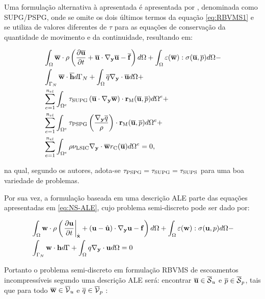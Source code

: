 \documentclass[_ArquivoPrincipal.tex]{subfiles}
\begin{document}
Uma formulação alternativa à apresentada é apresentada por , denominada como SUPG/PSPG, onde se omite os dois últimos termos da equação \ref{eq:RBVMS1} e se utiliza de valores diferentes de $\tau$ para as equações de conservação da quantidade de movimento e da continuidade, resultando em:

\begin{equation}
\begin{split}
    &\int_\Omega{\overline{\mathbf{w}}\cdot\rho\left({\frac{\partial{\overline{\mathbf{u}}}}{\partial{t}}+\overline{\mathbf{u}}\cdot\mathbf{\nabla_y}\overline{\mathbf{u}}-\overline{\mathbf{f}}}\right)d\Omega}+\int_\Omega{\mathbf{\varepsilon}(\overline{\mathbf{w}}):\mathbf{\sigma}(\overline{\mathbf{u}},\overline{p})d\Omega}-\\
    &\int_{\Gamma_N}{\overline{\mathbf{w}}\cdot\overline{\mathbf{h}}d\Gamma_N}+\int_\Omega{\overline{q}\mathbf{\nabla_y}\cdot\overline{\mathbf{u}}d\Omega}+\\
    &\sum_{e=1}^{n_{el}}{\int_{\Omega^e}{\tau_{\mathrm{SUPG}}\left({\overline{\mathbf{u}}\cdot\mathbf{\nabla_y}\overline{\mathbf{w}}}\right)\cdot\mathbf{r}_\mathrm{M}(\overline{\mathbf{u}},\overline{p}) d\Omega^e}}+\\
    &\sum_{e=1}^{n_{el}}{\int_{\Omega^e}{\tau_{\mathrm{PSPG}}\left({\frac{\mathbf{\nabla_y}\overline{q}}{\rho}}\right)\cdot\mathbf{r}_\mathrm{M}(\overline{\mathbf{u}},\overline{p}) d\Omega^e}}+\\
    &\sum_{e=1}^{n_{el}}{\int_{\Omega^e}{\rho\nu_{\mathrm{LSIC}}\mathbf{\nabla_y}\cdot\overline{\mathbf{w}}r_\mathrm{C}(\overline{\mathbf{u}}) d\Omega^e}}=0
    \text{,}
    \label{eq:SUPG-PSPG}
\end{split}
\end{equation}

\noindent na qual, segundo os autores, adota-se $\tau_{\mathrm{PSPG}}=\tau_{\mathrm{SUPG}}=\tau_{\mathrm{SUPS}}$ para uma boa variedade de problemas.

Por sua vez, a formulação baseada em uma descrição ALE parte das equações apresentadas em \ref{eq:NS-ALE}, cujo problema semi-discreto pode ser dado por:

\begin{equation}
\begin{split}
    &\int_\Omega{\mathbf{w}\cdot\rho\left({\left.\frac{\partial{\mathbf{u}}}{\partial{t}}\right|_{\hat{\mathbf{x}}}+(\mathbf{u}-\hat{\mathbf{u}})\cdot\mathbf{\nabla_y}\mathbf{u}-\mathbf{f}}\right)d\Omega}+\int_\Omega{\mathbf{\varepsilon}({\mathbf{w}}):\mathbf{\sigma}(\mathbf{u},p)d\Omega}-\\
    &\int_{\Gamma_N}{\mathbf{w}\cdot\mathbf{h}d\Gamma}+\int_\Omega{q\mathbf{\nabla_y}\cdot\mathbf{u}d\Omega}=0    
\end{split}
\end{equation}

Portanto o problema semi-discreto em formulação RBVMS de escoamentos incompressíveis segundo uma descrição ALE será: encontrar $\overline{\mathbf{u}}\in\overline{\mathcal{S}}_u$ e $\overline{p}\in\overline{\mathcal{S}}_p$, tais que para todo $\overline{\mathbf{w}}\in\overline{\mathcal{V}}_u$ e $\overline{q}\in\overline{\mathcal{V}}_p$ \cite{bazilevs2013computational}:
\end{document}

